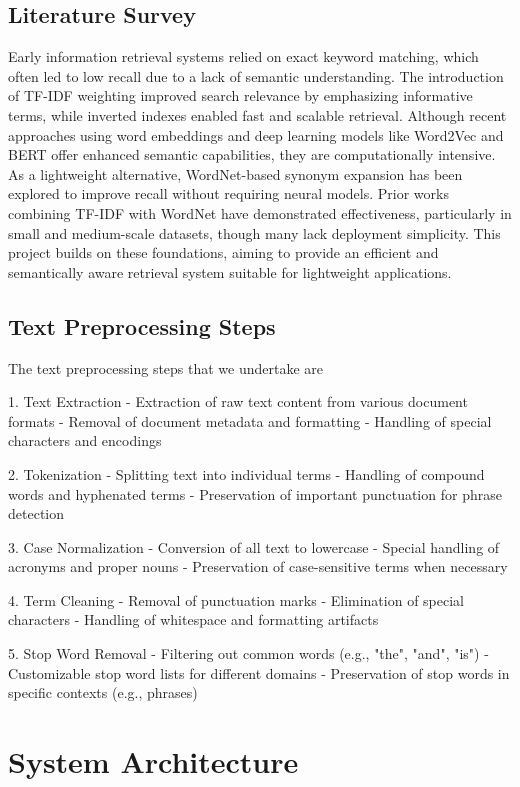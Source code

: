 \documentclass[conference]{IEEEtran}
\begin{document}
\subsection{Literature Survey}
Early information retrieval systems relied on exact keyword matching, which often led to low recall due to a lack of semantic understanding. The introduction of TF-IDF weighting improved search relevance by emphasizing informative terms, while inverted indexes enabled fast and scalable retrieval. Although recent approaches using word embeddings and deep learning models like Word2Vec and BERT offer enhanced semantic capabilities, they are computationally intensive. As a lightweight alternative, WordNet-based synonym expansion has been explored to improve recall without requiring neural models. Prior works combining TF-IDF with WordNet have demonstrated effectiveness, particularly in small and medium-scale datasets, though many lack deployment simplicity. This project builds on these foundations, aiming to provide an efficient and semantically aware retrieval system suitable for lightweight applications.

\subsection{Text Preprocessing Steps}
The text preprocessing steps that we undertake are

1. Text Extraction
   - Extraction of raw text content from various document formats
   - Removal of document metadata and formatting
   - Handling of special characters and encodings

2. Tokenization
   - Splitting text into individual terms
   - Handling of compound words and hyphenated terms
   - Preservation of important punctuation for phrase detection

3. Case Normalization
   - Conversion of all text to lowercase
   - Special handling of acronyms and proper nouns
   - Preservation of case-sensitive terms when necessary

4. Term Cleaning
   - Removal of punctuation marks
   - Elimination of special characters
   - Handling of whitespace and formatting artifacts

5. Stop Word Removal
   - Filtering out common words (e.g., "the", "and", "is")
   - Customizable stop word lists for different domains
   - Preservation of stop words in specific contexts (e.g., phrases)
   
\section{System Architecture}\label{AA}
\end{document}
